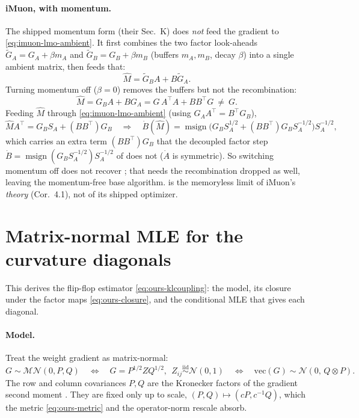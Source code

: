 \documentclass[11pt]{article}
\DeclareMathOperator{\polar}{msign}          %
\theoremstyle{plain}
\theoremstyle{definition}
\theoremstyle{remark}
\begin{document}
\paragraph{iMuon, with momentum.} The shipped momentum form (their Sec.~K) does \emph{not}
feed the gradient to \eqref{eq:imuon-lmo-ambient}. It first combines the two factor
look-aheads $\tilde G_A=G_A+\beta m_A$ and $\tilde G_B=G_B+\beta m_B$ (buffers $m_A,m_B$,
decay $\beta$) into a single ambient matrix, then feeds that:
\begin{equation*}
  \widehat M=\tilde G_B A+B\tilde G_A .
\end{equation*}
Turning momentum off ($\beta{=}0$) removes the buffers but not the recombination:
\begin{equation*}
  \widehat M=G_B A+B G_A=G\,A^\top A+BB^\top G\ \neq\ G .
\end{equation*}
Feeding $\widehat M$ through \eqref{eq:imuon-lmo-ambient} (using $G_A A^\top=B^\top G_B$),
\begin{equation*}
  \widehat M A^\top=G_B S_A+(BB^\top)G_B
  \quad\Longrightarrow\quad
  \dot B(\widehat M)=\polar\!\big(G_B S_A^{1/2}+(BB^\top)G_B S_A^{-1/2}\big)S_A^{-1/2},
\end{equation*}
which carries an extra term $(BB^\top)G_B$ that the decoupled factor step
$\dot B=\polar(G_B S_A^{-1/2})S_A^{-1/2}$ of  does not ($\dot A$ is symmetric).
So switching momentum off does not recover ; that needs the recombination
dropped as well, leaving the momentum-free base algorithm.  is the
memoryless limit of iMuon's \emph{theory} (Cor.~4.1), not of its shipped optimizer.

\section{Matrix-normal MLE for the curvature diagonals}
\label{app:matnormal}
This derives the flip-flop estimator \eqref{eq:ours-klcoupling}: the model, its closure
under the factor maps \eqref{eq:ours-closure}, and the conditional MLE that gives each
diagonal.

\paragraph{Model.} Treat the weight gradient as matrix-normal:
\begin{equation*}
  G\sim\mathcal{MN}(0,P,Q)
  \quad\Longleftrightarrow\quad
  G=P^{1/2}ZQ^{1/2},\ \ Z_{ij}\overset{\text{iid}}{\sim}\mathcal{N}(0,1)
  \quad\Longleftrightarrow\quad
  \mathrm{vec}(G)\sim\mathcal{N}(0,\,Q\otimes P).
\end{equation*}
The row and column covariances $P,Q$ are the Kronecker factors of the gradient second
moment \cite{soap,klshampoo}. They are fixed only up to scale,
$(P,Q)\mapsto(cP,c^{-1}Q)$, which the metric \eqref{eq:ours-metric} and the
operator-norm rescale absorb.
\end{document}
